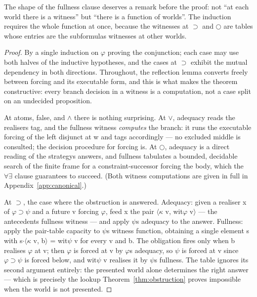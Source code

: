 The shape of the fullness clause deserves a remark before the proof:
not ``at each world there is a witness'' but ``there is a function of
worlds''. The induction requires the whole function at once, because the
witnesses at \ensuremath{\supset} and \ensuremath{\bigcirc} are tables whose entries are the subformula\textquotesingle s
witnesses at other worlds.

\begin{proof}
By a single induction on \ensuremath{\varphi} proving the conjunction; each
case may use both halves of the inductive hypotheses, and the cases at
\ensuremath{\supset} exhibit the mutual dependency in both directions. Throughout, the
reflection lemma converts freely between forcing and its executable
form, and this is what makes the theorem constructive: every
branch decision in a witness is a computation, not a case split on an
undecided proposition.

At atoms, false, and \ensuremath{\wedge} there is nothing surprising. At \ensuremath{\vee},
adequacy reads the realiser\textquotesingle s tag, and the fullness witness
\emph{computes} the branch: it runs the executable forcing of the left
disjunct at w and tags accordingly --- no excluded middle is consulted;
the decision procedure for forcing is. At \ensuremath{\bigcirc}, adequacy is a direct
reading of the strategy\textquotesingle s answers, and fullness tabulates a bounded,
decidable search of the finite frame for a constraint-successor forcing
the body, which the \ensuremath{\forall\exists} clause guarantees to succeed. (Both
witness computations are given in full in
Appendix~\ref{app:canonical}.)

At \ensuremath{\supset}, the case where the obstruction is answered. Adequacy: given a
realiser x of \ensuremath{\varphi \supset \psi} and a future v forcing \ensuremath{\varphi},
feed x the pair \ensuremath{\langle\kappa} v, wit\ensuremath{\varphi} v\ensuremath{\rangle} --- the antecedent\textquotesingle s fullness witness --- and
apply \ensuremath{\psi}\textquotesingle s adequacy to the answer. Fullness: apply the pair-table
capacity to \ensuremath{\psi}\textquotesingle s witness function, obtaining a single element s with
s\ensuremath{\cdot\langle\kappa} v, b\ensuremath{\rangle} = wit\ensuremath{\psi} v for every v and b. The obligation fires only when b
realises \ensuremath{\varphi} at v; then \ensuremath{\varphi} is forced at v by \ensuremath{\varphi}\textquotesingle s adequacy, so \ensuremath{\psi} is forced
at v since \ensuremath{\varphi \supset \psi} is forced below, and wit\ensuremath{\psi} v realises it by \ensuremath{\psi}\textquotesingle s
fullness. The table ignores its second argument entirely: the presented
world alone determines the right answer --- which is precisely the lookup
Theorem~\ref{thm:obstruction} proves impossible when the world is not
presented.
\end{proof}


